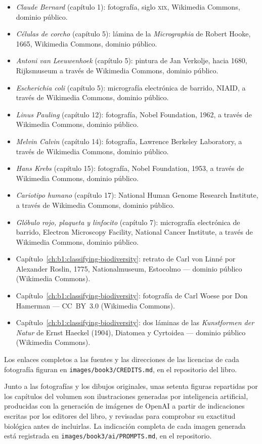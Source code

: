 \begin{itemize}
  \item \emph{Claude Bernard} (capítulo 1): fotografía, siglo
        \textsc{xix}, Wikimedia Commons, dominio público.
  \item \emph{Células de corcho} (capítulo 5): lámina de la
        \emph{Micrographia} de Robert Hooke, 1665, Wikimedia Commons,
        dominio público.
  \item \emph{Antoni van Leeuwenhoek} (capítulo 5): pintura de Jan
        Verkolje, hacia 1680, Rijksmuseum a través de Wikimedia
        Commons, dominio público.
  \item \emph{Escherichia coli} (capítulo 5): micrografía electrónica
        de barrido, NIAID, a través de Wikimedia Commons, dominio
        público.
  \item \emph{Linus Pauling} (capítulo 12): fotografía, Nobel
        Foundation, 1962, a través de Wikimedia Commons, dominio
        público.
  \item \emph{Melvin Calvin} (capítulo 14): fotografía, Lawrence
        Berkeley Laboratory, a través de Wikimedia Commons, dominio
        público.
  \item \emph{Hans Krebs} (capítulo 15): fotografía, Nobel Foundation,
        1953, a través de Wikimedia Commons, dominio público.
  \item \emph{Cariotipo humano} (capítulo 17): National Human Genome
        Research Institute, a través de Wikimedia Commons, dominio
        público.
  \item \emph{Glóbulo rojo, plaqueta y linfocito} (capítulo 7):
        micrografía electrónica de barrido, Electron Microscopy
        Facility, National Cancer Institute, a través de Wikimedia
        Commons, dominio público.
  \item Capítulo~\ref{ch:b1:classifying-biodiversity}: retrato de Carl von Linné por Alexander Roslin, 1775, Nationalmuseum, Estocolmo --- dominio público (Wikimedia Commons).
  \item Capítulo~\ref{ch:b1:classifying-biodiversity}: fotografía de Carl Woese por Don Hamerman --- CC~BY~3.0 (Wikimedia Commons).
  \item Capítulo~\ref{ch:b1:classifying-biodiversity}: dos láminas de las \emph{Kunstformen der Natur} de Ernst Haeckel (1904), Diatomea y Cyrtoidea --- dominio público (Wikimedia Commons).
\end{itemize}

Los enlaces completos a las fuentes y las direcciones de las licencias
de cada fotografía figuran en \texttt{images/\allowbreak book3/\allowbreak CREDITS.md},
en el repositorio del libro.

\bigskip
Junto a las fotografías y los dibujos originales, unas setenta
figuras repartidas por los capítulos del volumen son ilustraciones
generadas por inteligencia artificial, producidas con la generación de
imágenes de OpenAI a partir de indicaciones escritas por los editores
del libro, y revisadas para comprobar su exactitud biológica antes de
incluirlas. La indicación completa de cada imagen generada está
registrada en \texttt{images/\allowbreak book3/\allowbreak ai/\allowbreak PROMPTS.md}, en el repositorio.
\par\endgroup
\clearpage
